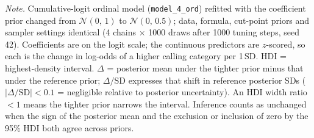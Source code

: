 \begin{table}[htbp]
\begin{minipage}{\linewidth}
\textit{Note.} Cumulative-logit ordinal model (\texttt{model\_4\_ord}) refitted with the coefficient prior changed from $\mathcal{N}(0,\,1)$ to $\mathcal{N}(0,\,0.5)$; data, formula, cut-point priors and sampler settings identical (4 chains $\times$ 1000 draws after 1000 tuning steps, seed 42). Coefficients are on the logit scale; the continuous predictors are $z$-scored, so each is the change in log-odds of a higher calling category per 1\,SD. HDI = highest-density interval. $\Delta$ = posterior mean under the tighter prior minus that under the reference prior; $\Delta/\mathrm{SD}$ expresses that shift in reference posterior SDs ($\lvert\Delta/\mathrm{SD}\rvert<0.1$ = negligible relative to posterior uncertainty). An HDI width ratio $<1$ means the tighter prior narrows the interval. Inference counts as unchanged when the sign of the posterior mean and the exclusion or inclusion of zero by the 95\% HDI both agree across priors.
\end{minipage}
\end{table}